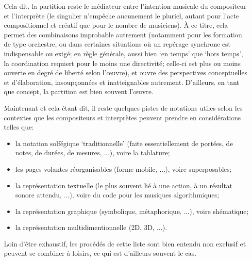 \documentclass{article}
\begin{document}

Cela dit, la partition reste le médiateur entre l'intention musicale du compositeur et l'interprète (le singulier n'empêche aucunement le pluriel, autant pour l'acte compositionnel et créatif que pour le nombre de musiciens). À ce titre, cela permet des combinaisons improbable autrement (notamment pour les formation de type orchestre, ou dans certaines situations où un repérage synchrone est indispensable ou exigé; en règle générale, aussi bien `en temps' que `hors temps', la coordination requiert pour le moins une directivité; celle-ci est plus ou moins ouverte en degré de liberté selon l'œuvre), et ouvre des perspectives conceptuelles et d'élaboration, insoupçonnées et inatteignables autrement. D'ailleurs, en tant que concept, la partition est bien souvent l'œuvre.  

\bigskip

Maintenant et cela étant dit, il reste quelques pistes de notations utiles selon les contextes que les compositeurs et interprètes peuvent prendre en considérations telles que:

\begin{itemize}
\item la notation solfégique `traditionnelle' (faite essentiellement de portées, de notes, de durées, de mesures, ...), voire la tablature;
\item les pages volantes réorganisables  (forme mobile, ...), voire superposables;
\item la représentation textuelle (le plus souvent lié à une action, à un résultat sonore attendu, ...), voire du code pour les musiques algorithmiques;
\item la représentation graphique (symbolique, métaphorique, ...), voire shématique;
\item la représentation multidimentionnelle (2D, 3D, ...).
\end{itemize}

Loin d'être exhaustif, les procédés de cette liste sont bien entendu non exclusif et peuvent se combiner à loisirs, ce qui est d'ailleurs souvent le cas.
\end{document}
